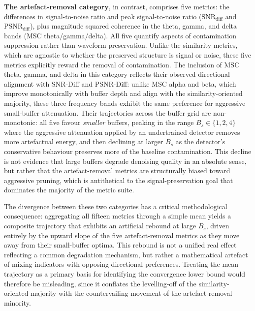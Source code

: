 \documentclass[MScCS,12pt,oneside,final]{uccthesis}
\begin{document}
\textbf{The artefact-removal category}, in contrast, comprises five metrics: the differences in signal-to-noise ratio and peak signal-to-noise ratio ($\mathrm{SNR}_{\mathrm{diff}}$ and $\mathrm{PSNR}_{\mathrm{diff}}$), plus magnitude squared coherence in the theta, gamma, and delta bands (MSC theta/gamma/delta). All five quantify aspects of contamination suppression rather than waveform preservation. Unlike the similarity metrics, which are agnostic to whether the preserved structure is signal or noise, these five metrics explicitly reward the removal of contamination. The inclusion of MSC theta, gamma, and delta in this category reflects their observed directional alignment with SNR-Diff and PSNR-Diff: unlike MSC alpha and beta, which improve monotonically with buffer depth and align with the similarity-oriented majority, these three frequency bands exhibit the same preference for aggressive small-buffer attenuation. Their trajectories across the buffer grid are non-monotonic: all five favour \emph{smaller} buffers, peaking in the range $B_s \in \{1, 2, 4\}$ where the aggressive attenuation applied by an undertrained detector removes more artefactual energy, and then declining at larger $B_s$ as the detector's conservative behaviour preserves more of the baseline contamination. This decline is not evidence that large buffers degrade denoising quality in an absolute sense, but rather that the artefact-removal metrics are structurally biased toward aggressive pruning, which is antithetical to the signal-preservation goal that dominates the majority of the metric suite.

The divergence between these two categories has a critical methodological consequence: aggregating all fifteen metrics through a simple mean yields a composite trajectory that exhibits an artificial rebound at large $B_s$, driven entirely by the upward slope of the five artefact-removal metrics as they move away from their small-buffer optima. This rebound is not a unified real effect reflecting a common degradation mechanism, but rather a mathematical artefact of mixing indicators with opposing directional preferences. Treating the mean trajectory as a primary basis for identifying the convergence lower bound would therefore be misleading, since it conflates the levelling-off of the similarity-oriented majority with the countervailing movement of the artefact-removal minority.
\end{document}
